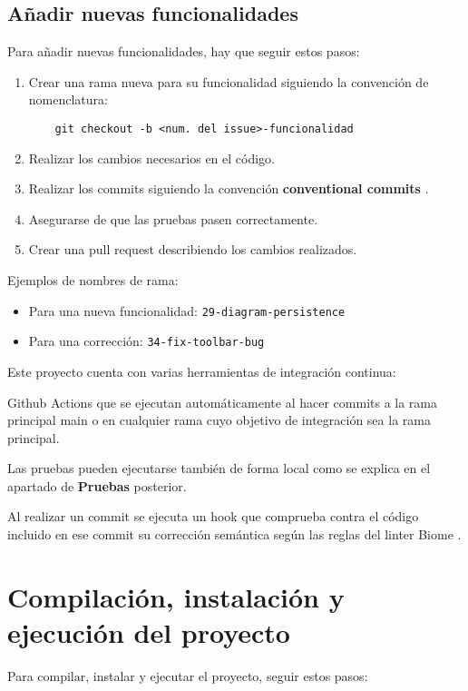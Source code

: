 \subsection{Añadir nuevas funcionalidades}
Para añadir nuevas funcionalidades, hay que seguir estos pasos:
\begin{enumerate}
    \item Crear una rama nueva para su funcionalidad siguiendo la convención de nomenclatura:
    \begin{verbatim}
    git checkout -b <num. del issue>-funcionalidad
    \end{verbatim}
    \item Realizar los cambios necesarios en el código.
    \item Realizar los commits siguiendo la convención \textbf{conventional commits} \cite{conventional-commits}.
    \item Asegurarse de que las pruebas pasen correctamente.
    \item Crear una pull request describiendo los cambios realizados.
\end{enumerate}

Ejemplos de nombres de rama:
\begin{itemize}
    \item Para una nueva funcionalidad: \texttt{29-diagram-persistence}
    \item Para una corrección: \texttt{34-fix-toolbar-bug}
\end{itemize}

Este proyecto cuenta con varias herramientas de integración continua:

Github Actions \cite{github-actions} que se ejecutan automáticamente al hacer commits a la rama principal main o en cualquier rama cuyo objetivo de integración sea la rama principal.


Las pruebas pueden ejecutarse también de forma local como se explica en el apartado de \textbf{Pruebas} posterior.

Al realizar un commit se ejecuta un hook que comprueba contra el código incluido en ese commit su corrección semántica según las reglas del linter Biome \cite{biome}.

\section{Compilación, instalación y ejecución del proyecto}
Para compilar, instalar y ejecutar el proyecto, seguir estos pasos:

